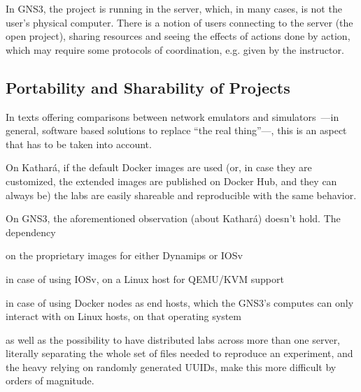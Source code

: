 

In GNS3, the project is running in the server, which, in many cases, is not the user's physical computer.
There is a notion of users connecting to the server (the open project), sharing resources and seeing the effects of actions done by action, which may require some protocols of coordination, e.g. given by the instructor.

\subsection{Portability and Sharability of Projects}
\label{subsec:comparativeportability}
In texts offering comparisons between network emulators and simulators~\cite{netkit-full,reproduciblenetexp}---in general, software based solutions to replace ``the real thing''---, this is an aspect that has to be taken into account.

On Kathará, if the default Docker images are used (or, in case they are customized, the extended images are published on Docker Hub, and they can always be) the labs are easily shareable and reproducible with the same behavior.

On GNS3, the aforementioned observation (about Kathará) doesn't hold.
The dependency
  \begin{enumerate*}[label=(\roman*), itemjoin={{, }}, itemjoin*={{, and }}]
  \item on the proprietary images for either Dynamips or IOSv
  \item in case of using IOSv, on a Linux host for QEMU/KVM support
  \item in case of using Docker nodes as end hosts, which the GNS3's computes can only interact with on Linux hosts, on that operating system
  \end{enumerate*}
as well as the possibility to have distributed labs across more than one server, literally separating the whole set of files needed to reproduce an experiment, and the heavy relying on randomly generated UUIDs, make this more difficult by orders of magnitude. %

